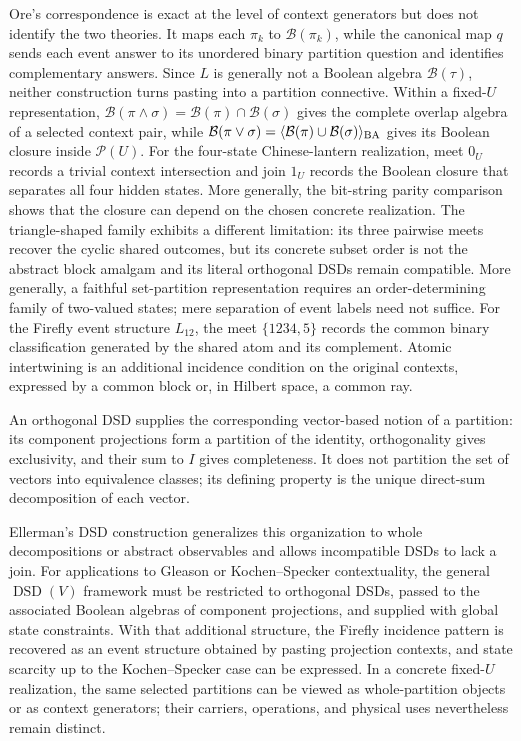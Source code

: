 \documentclass[aps,pra,reprint,nofootinbib]{revtex4-2}
\newcommand{\Pow}{\mathcal{P}}
\newcommand{\BA}{\mathcal{B}}
\newcommand{\DSD}{\operatorname{DSD}}
\begin{document}
Ore's correspondence is exact at the level of context generators but does not
identify the two theories.  It maps each $\pi_k$ to $\BA(\pi_k)$, while the
canonical map $q$ sends each event answer to its unordered binary partition
question and identifies complementary answers.  Since $L$ is generally not a
Boolean algebra $\BA(\tau)$, neither construction turns pasting into a
partition connective.  Within a fixed-$U$ representation,
$\BA(\pi\wedge\sigma)=\BA(\pi)\cap\BA(\sigma)$ gives the complete overlap
algebra of a selected context pair, while
$\BA(\pi\vee\sigma)=\langle\BA(\pi)\cup\BA(\sigma)\rangle_{\rm BA}$ gives its
Boolean closure inside $\Pow(U)$.  For the four-state Chinese-lantern
realization, meet $0_U$ records a trivial context intersection and join $1_U$
records the Boolean closure that separates all four hidden states.  More
generally, the bit-string parity comparison shows that the closure can depend
on the chosen concrete realization.  The triangle-shaped family exhibits a
different limitation: its three pairwise meets recover the cyclic shared
outcomes, but its concrete subset order is not the abstract block amalgam and
its literal orthogonal DSDs remain compatible.  More generally, a faithful
set-partition representation requires an order-determining family of
two-valued states; mere separation of event labels need not suffice.  For the Firefly event structure
$L_{12}$, the meet $\{1234,5\}$ records the common binary
classification generated by the shared atom and its complement.  Atomic
intertwining is an additional incidence condition on the original contexts,
expressed by a common block or, in Hilbert space, a common ray.

An orthogonal DSD supplies the corresponding vector-based notion of a
partition: its component projections form a partition of the identity,
orthogonality gives exclusivity, and their sum to $I$ gives completeness.  It
does not partition the set of vectors into equivalence classes; its defining
property is the unique direct-sum decomposition of each vector.

Ellerman's DSD construction generalizes this organization to whole
decompositions or abstract observables and allows incompatible DSDs to lack a
join.  For applications to
Gleason or Kochen--Specker contextuality, the general $\DSD(V)$ framework must
be restricted to orthogonal DSDs, passed to the associated Boolean algebras of
component projections, and supplied with global state constraints.  With that
additional structure, the Firefly incidence pattern is recovered as an event
structure obtained by pasting projection contexts, and state scarcity up to
the Kochen--Specker case can be expressed.  In a concrete fixed-$U$
realization, the same selected partitions can be viewed as whole-partition
objects or as context generators; their carriers, operations, and physical
uses nevertheless remain distinct.
\end{document}
